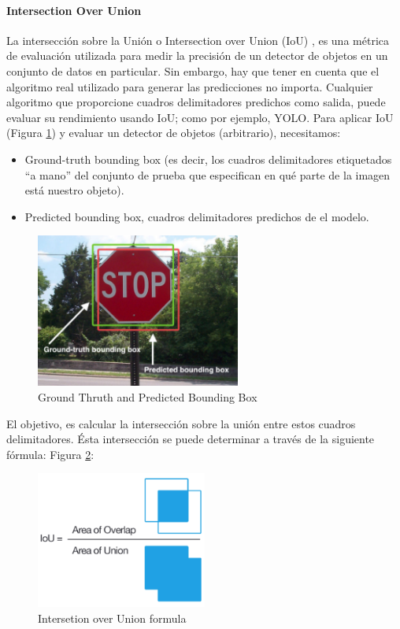 \newpage
\paragraph{Intersection Over Union}
La intersección sobre la Unión o Intersection over Union (IoU) \cite{iou}, es una  métrica de evaluación utilizada para medir la precisión de un detector de objetos en un conjunto de datos en particular. Sin embargo, hay que tener  en cuenta que el algoritmo real utilizado para generar las predicciones no importa. Cualquier algoritmo que proporcione cuadros delimitadores predichos como salida, puede evaluar su rendimiento usando IoU; como por ejemplo, YOLO. Para aplicar IoU (Figura \ref{fig:iou 1}) y evaluar un detector de objetos (arbitrario), necesitamos:

\begin{itemize}
    \item Ground-truth bounding box (es decir, los cuadros delimitadores etiquetados ``a mano'' del conjunto de prueba que especifican en qué parte de la imagen está nuestro objeto).
    \item Predicted bounding box, cuadros delimitadores predichos de el modelo.
\end{itemize}

\begin{figure}[h!]
    \centering
    \includegraphics[width=0.6\textwidth]{img/iou-1.png}
    \caption{Ground Thruth and Predicted Bounding Box}
    \label{fig:iou 1}
\end{figure}

El objetivo, es calcular la intersección sobre la unión entre estos cuadros delimitadores. Ésta intersección se puede determinar a través de la siguiente fórmula:  Figura \ref{fig:iou formula}:

\begin{figure}[h!]
    \centering
    \includegraphics[width=0.5\textwidth]{img/iou-2.png}
    \caption{Intersetion over Union formula}
    \label{fig:iou formula}
\end{figure}

